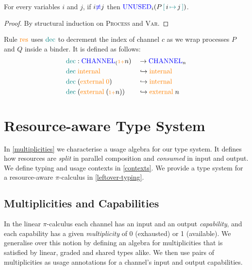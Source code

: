 \documentclass[]{llncs}
\newcommand{\picalc}{$\pi$-calculus}
\newcommand{\type}[1]{\textcolor{blue}{\operatorname{#1}}}
\newcommand{\constr}[1]{\textcolor{orange}{\operatorname{#1}}}
\newcommand{\func}[1]{\textcolor{teal}{\operatorname{#1}}}
\newcommand{\suc}{\constr{\scriptstyle 1+}}
\newcommand{\subst}[3]{#1 \, \func{[} \, #3 \, \func{\mapsto} \,#2 \, \func{]}}
\newcommand{\Unused}{\type{UNUSED}}
\newcommand{\Channel}{\type{CHANNEL}}
\begin{document}
\begin{nilemma}
  \label{lm:substitution-unused}
  For every variables $i$ and $j$, if $i \type{\not\equiv} j$ then $\Unused_i \allowbreak (\subst{P}{j}{i})$.
\end{nilemma}
\begin{proof}
  By structural induction on \textsc{Process} and \textsc{Var}.
\end{proof}

Rule $\constr{res}$ uses $\func{dec}$ to decrement the index of channel $c$ as we wrap processes $P$ and $Q$ inside a binder.
It is defined as follows:
\begin{equation*}
  \begin{aligned}
    & \func{dec} : \Channel_(\suc n) && \to \Channel_n \\
    & \func{dec} \; \constr{internal}                 && \hookrightarrow \constr{internal} \\
    & \func{dec} \; (\constr{external} \; \constr{0}) && \hookrightarrow \constr{internal} \\
    & \func{dec} \; (\constr{external} \; (\suc n))   && \hookrightarrow \constr{external} \; n \\
  \end{aligned}
\end{equation*}

\section{Resource-aware Type System}
\label{type-system}

In \autoref{multiplicities} we characterise a usage algebra for our type system.
It defines how resources are \emph{split} in parallel composition and \emph{consumed} in input and output.
We define typing and usage contexts in \autoref{contexts}.
We provide a type system for a resource-aware \picalc{} in \autoref{leftover-typing}.

\subsection{Multiplicities and Capabilities}
\label{multiplicities}

In the linear \picalc{} each channel has an input and an output \emph{capability}, and each capability has a given \emph{multiplicity} of 0 (exhausted) or 1 (available).
We generalise over this notion by defining an algebra for multiplicities that is satisfied by linear, graded and shared types alike.
We then use pairs of multiplicities as usage annotations for a channel's input and output capabilities.
\end{document}
